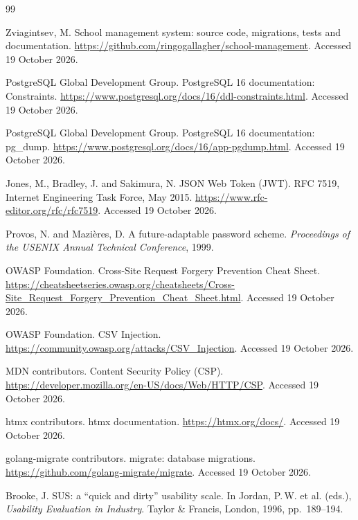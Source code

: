 \clearpage
\renewcommand{\bibname}{Bibliography}

\begin{thebibliography}{99}
\setlength{\itemsep}{0.55em}

 Zviagintsev, M. School management system: source code, migrations, tests and documentation. \url{https://github.com/ringogallagher/school-management}. Accessed 19 October 2026.

 PostgreSQL Global Development Group. PostgreSQL 16 documentation: Constraints. \url{https://www.postgresql.org/docs/16/ddl-constraints.html}. Accessed 19 October 2026.

 PostgreSQL Global Development Group. PostgreSQL 16 documentation: pg\_dump. \url{https://www.postgresql.org/docs/16/app-pgdump.html}. Accessed 19 October 2026.

 Jones, M., Bradley, J. and Sakimura, N. JSON Web Token (JWT). RFC 7519, Internet Engineering Task Force, May 2015. \url{https://www.rfc-editor.org/rfc/rfc7519}. Accessed 19 October 2026.

 Provos, N. and Mazi\`eres, D. A future-adaptable password scheme. \emph{Proceedings of the USENIX Annual Technical Conference}, 1999.

 OWASP Foundation. Cross-Site Request Forgery Prevention Cheat Sheet. \url{https://cheatsheetseries.owasp.org/cheatsheets/Cross-Site_Request_Forgery_Prevention_Cheat_Sheet.html}. Accessed 19 October 2026.

 OWASP Foundation. CSV Injection. \url{https://community.owasp.org/attacks/CSV_Injection}. Accessed 19 October 2026.

 MDN contributors. Content Security Policy (CSP). \url{https://developer.mozilla.org/en-US/docs/Web/HTTP/CSP}. Accessed 19 October 2026.

 htmx contributors. htmx documentation. \url{https://htmx.org/docs/}. Accessed 19 October 2026.

 golang-migrate contributors. migrate: database migrations. \url{https://github.com/golang-migrate/migrate}. Accessed 19 October 2026.

 Brooke, J. SUS: a ``quick and dirty'' usability scale. In Jordan, P.\,W. et al. (eds.), \emph{Usability Evaluation in Industry}. Taylor \& Francis, London, 1996, pp.\ 189--194.

\end{thebibliography}

